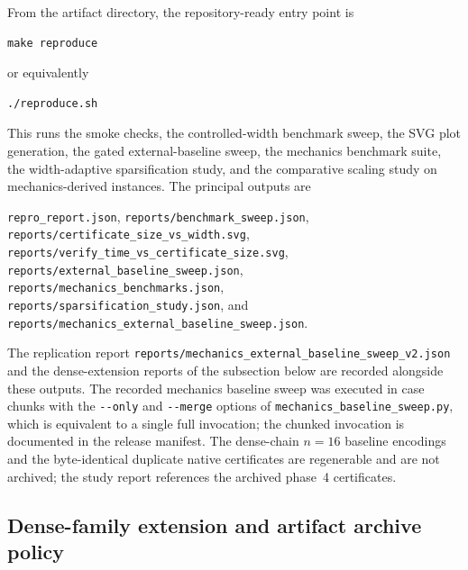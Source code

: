 From the artifact directory, the repository-ready entry point is
\begin{verbatim}
make reproduce
\end{verbatim}
or equivalently
\begin{verbatim}
./reproduce.sh
\end{verbatim}
This runs the smoke checks, the controlled-width benchmark sweep, the SVG plot
generation, the gated external-baseline sweep, the mechanics benchmark suite,
the width-adaptive sparsification study, and the comparative scaling study on
mechanics-derived instances. The principal outputs are
\begin{center}
\texttt{repro\_report.json}, \texttt{reports/benchmark\_sweep.json},\\
\texttt{reports/certificate\_size\_vs\_width.svg},\\
\texttt{reports/verify\_time\_vs\_certificate\_size.svg},\\
\texttt{reports/external\_baseline\_sweep.json},\\
\texttt{reports/mechanics\_benchmarks.json},\\
\texttt{reports/sparsification\_study.json}, and\\
\texttt{reports/mechanics\_external\_baseline\_sweep.json}.
\end{center}
The replication report
\texttt{reports/mechanics\_external\_baseline\_sweep\_v2.json} and the
dense-extension reports of the subsection below are recorded
alongside these outputs.
The recorded mechanics baseline sweep was executed in case chunks with the
\texttt{-{}-only} and \texttt{-{}-merge} options of
\texttt{mechanics\_baseline\_sweep.py}, which is equivalent to a single full
invocation; the chunked invocation is documented in the release manifest. The
dense-chain $n=16$ baseline encodings and the byte-identical duplicate native
certificates are regenerable and are not archived; the study report references
the archived phase~4 certificates.

\subsection{Dense-family extension and artifact archive policy}

